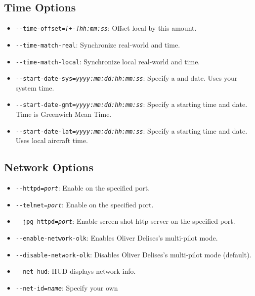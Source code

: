 \subsection{Time Options}
\begin{itemize}
\item{\texttt{-$ $-time-offset={\it [+-]hh:mm:ss}}}: Offset local  by this amount.
\item{\texttt{-$ $-time-match-real}}: Synchronize real-world and \FlightGear{} time.
\item{\texttt{-$ $-time-match-local}}: Synchronize local real-world and \FlightGear{} time.
\item{\texttt{-$ $-start-date-sys={\it yyyy:mm:dd:hh:mm:ss}}}: Specify a  and date. Uses your system time.
\item{\texttt{-$ $-start-date-gmt={\it yyyy:mm:dd:hh:mm:ss}}}: Specify a starting time and
date. Time is Greenwich Mean Time.
\item{\texttt{-$ $-start-date-lat={\it yyyy:mm:dd:hh:mm:ss}}}: Specify a starting time and
date. Uses local aircraft time.
\end{itemize}
\subsection{Network Options}
\begin{itemize}
\item{\texttt{-$ $-httpd={\it port}}}: Enable  on the specified port.
\item{\texttt{-$ $-telnet={\it port}}}: Enable  on the specified port.
\item{\texttt{-$ $-jpg-httpd={\it port}}}: Enable screen shot http server on the specified port.
\item{\texttt{-$ $-enable-network-olk}}: Enables Oliver Delises's multi-pilot mode.
\item{\texttt{-$ $-disable-network-olk}}: Disables Oliver Delises's multi-pilot mode (default).
\item{\texttt{-$ $-net-hud}}: HUD displays network info.
\item{\texttt{-$ $-net-id={\it name}}}: Specify your own 
 \end{itemize}
